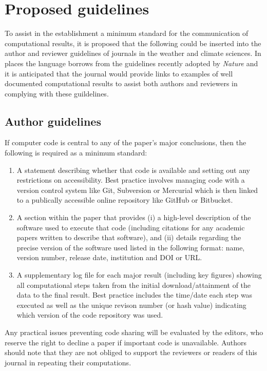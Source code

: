 \section{Proposed guidelines}\label{s:guidelines}

To assist in the establishment a minimum standard for the communication of computational results, it is proposed that the following could be inserted into the author and reviewer guidelines of journals in the weather and climate sciences. In places the language borrows from the guidelines recently adopted by \textit{Nature} \citep{Nature2014} and it is anticipated that the journal would provide links to examples of well documented computational results to assist both authors and reviewers in complying with these guildelines.

\subsection{Author guidelines}

If computer code is central to any of the paper's major conclusions, then the following is required as a minimum standard: 
\begin{enumerate}
\item A statement describing whether that code is available and setting out any restrictions on accessibility. Best practice involves managing code with a version control system like Git, Subversion or Mercurial which is then linked to a publically accessible online repository like GitHub or Bitbucket. 
\item A section within the paper that provides (i) a high-level description of the software used to execute that code (including citations for any academic papers written to describe that software), and (ii) details regarding the precise version of the software used listed in the following format: name, version number, release date, institution and DOI or URL.
\item A supplementary log file for each major result (including key figures) showing all computational steps taken from the initial download/attainment of the data to the final result. Best practice includes the time/date each step was executed as well as the unique revison number (or hash value) indicating which version of the code repository was used.
\end{enumerate}

Any practical issues preventing code sharing will be evaluated by the editors, who reserve the right to decline a paper if important code is unavailable. Authors should note that they are not obliged to support the reviewers or readers of this journal in repeating their computations.

